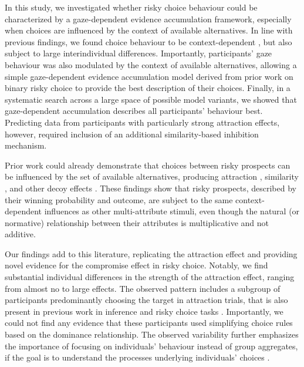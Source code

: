 \documentclass[11pt, a4paper]{article}
\begin{document}
In this study, we investigated whether risky choice behaviour could be characterized by a gaze-dependent evidence accumulation framework, especially when choices are influenced by the context of available alternatives. In line with previous findings, we found choice behaviour to be context-dependent \parencite{busemeyer2019CognitiveNeuralBases}, but also subject to large interindividual differences. Importantly, participants’ gaze behaviour was also modulated by the context of available alternatives, allowing a simple gaze-dependent evidence accumulation model derived from prior work on binary risky choice \parencite{glickman2019FormationPreferenceRisky} to provide the best description of their choices. Finally, in a systematic search across a large space of possible model variants, we showed that gaze-dependent accumulation describes all participants’ behaviour best. Predicting data from participants with particularly strong attraction effects, however, required inclusion of an additional similarity-based inhibition mechanism.

Prior work could already demonstrate that choices between risky prospects can be influenced by the set of available alternatives, producing attraction \parencite{huber1982AddingAsymmetricallyDominated,mohr2017AttractionEffectRisky,soltani2012RangeNormalizationModelContextDependent,wedell1991DistinguishingModelsContextually}, similarity \parencite{tversky1972EliminationAspectsTheory}, and other decoy effects \parencite{soltani2012RangeNormalizationModelContextDependent}. These findings show that risky prospects, described by their winning probability and outcome, are subject to the same context-dependent influences as other multi-attribute stimuli, even though the natural (or normative) relationship between their attributes is multiplicative and not additive.

Our findings add to this literature, replicating the attraction effect and providing novel evidence for the compromise effect in risky choice. Notably, we find substantial individual differences in the strength of the attraction effect, ranging from almost no to large effects. The observed pattern includes a subgroup of participants predominantly choosing the target in attraction trials, that is also present in previous work in inference \parencite{trueblood2012MultialternativeContextEffects} and risky choice tasks \parencite{mohr2017AttractionEffectRisky}. Importantly, we could not find any evidence that these participants used simplifying choice rules based on the dominance relationship. The observed variability further emphasizes the importance of focusing on individuals’ behaviour instead of group aggregates, if the goal is to understand the processes underlying individuals’ choices \parencite{liew2016AppropriacyAveragingStudy}.
\end{document}
